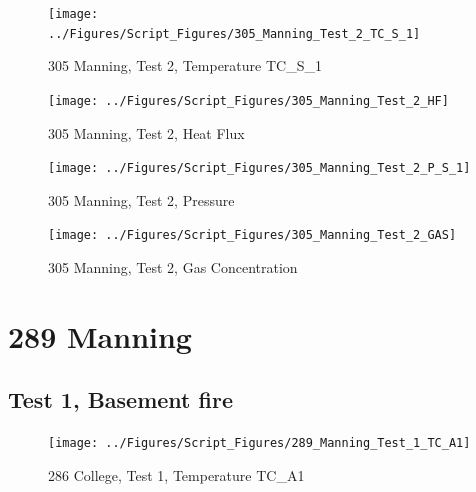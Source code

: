 \documentclass[12pt,oneside]{book}
\begin{document}
\begin{figure}[!ht]
\texttt{[image: ../Figures/Script\_Figures/305\_Manning\_Test\_2\_TC\_S\_1]}
\caption{305 Manning, Test 2, Temperature TC\_S\_1}
\label{fig:305_Manning_Test_2_TC_S_1}
\end{figure}

\begin{figure}[!ht]
\texttt{[image: ../Figures/Script\_Figures/305\_Manning\_Test\_2\_HF]}
\caption{305 Manning, Test 2, Heat Flux}
\label{fig:305_Manning_Test_2_HF}
\end{figure}

\begin{figure}[!ht]
\texttt{[image: ../Figures/Script\_Figures/305\_Manning\_Test\_2\_P\_S\_1]}
\caption{305 Manning, Test 2, Pressure}
\label{fig:305_Manning_Test_2_P_S_1}
\end{figure}

\begin{figure}[!ht]
\texttt{[image: ../Figures/Script\_Figures/305\_Manning\_Test\_2\_GAS]}
\caption{305 Manning, Test 2, Gas Concentration}
\label{fig:305_Manning_Test_2_GAS}
\end{figure}







\clearpage


\section{289 Manning}

\subsection{Test 1, Basement fire}

\begin{figure}[!ht]
\texttt{[image: ../Figures/Script\_Figures/289\_Manning\_Test\_1\_TC\_A1]}
\caption{286 College, Test 1, Temperature TC\_A1}
\label{fig:289_Manning_Test_1_TC_A1}
\end{figure}
\end{document}
